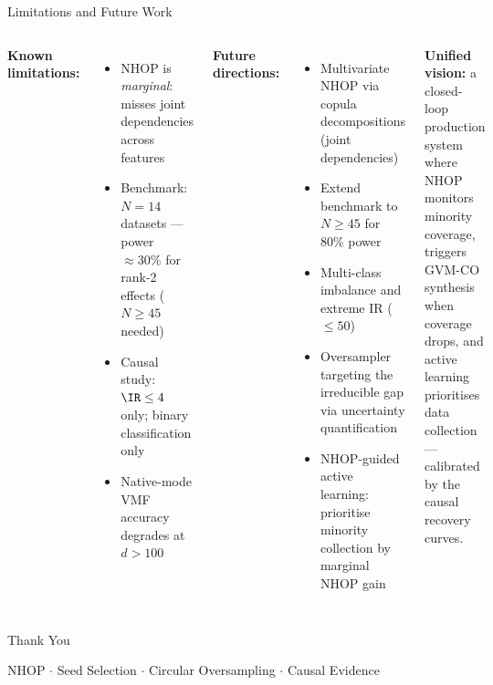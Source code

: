 \documentclass[aspectratio=169,10pt]{beamer}
\newcommand{\NHOP}{\mathrm{NHOP}}
\newcommand{\TV}{\mathrm{TV}}
\begin{document}
\begin{frame}{Limitations and Future Work}
\begin{columns}[T]
\textbf{Known limitations:}
\begin{itemize}
  \item NHOP is \emph{marginal}: misses joint dependencies across features
  \item Benchmark: $N=14$ datasets — power $\approx 30\%$ for rank-2 effects ($N\geq45$ needed)
  \item Causal study: $\IR\leq4$ only; binary classification only
  \item Native-mode VMF accuracy degrades at $d>100$
\end{itemize}

\textbf{Future directions:}
\begin{itemize}
  \item Multivariate NHOP via copula decompositions (joint dependencies)
  \item Extend benchmark to $N\geq45$ for 80\% power
  \item Multi-class imbalance and extreme IR ($\leq50$)
  \item Oversampler targeting the irreducible gap via uncertainty quantification
  \item NHOP-guided active learning: prioritise minority collection by marginal NHOP gain
\end{itemize}

\vspace{6pt}
\textbf{Unified vision:} a closed-loop production system where NHOP monitors minority coverage, triggers GVM-CO synthesis when coverage drops, and active learning prioritises data collection — calibrated by the causal recovery curves.
\end{columns}
\end{frame}

\begin{frame}[plain]
\begin{center}
\vspace{1.0cm}
{\Huge\color{myblue} Thank You}
\vspace{0.8cm}

{\large\color{myblue!70!black} NHOP $\cdot$ Seed Selection $\cdot$ Circular Oversampling $\cdot$ Causal Evidence}

\vspace{0.7cm}
\end{center}
\end{frame}
\end{document}
